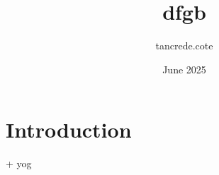 \documentclass{article}
\title{dfgb}
\author{tancrede.cote }
\date{June 2025}
\begin{document}
\maketitle

\section{Introduction}

+
yog
\end{document}
